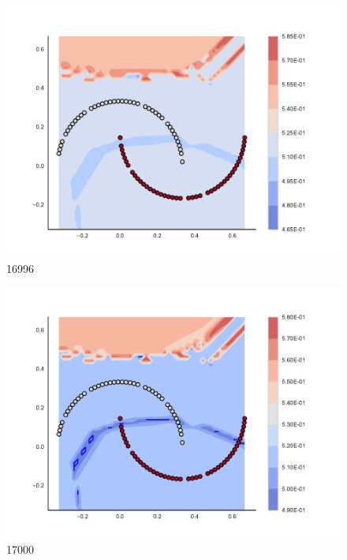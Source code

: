 \begin{subfigure}[b]{0.09\textwidth}
    \includegraphics[clip, trim=2.35cm 1.75cm 4.5cm 0cm,width=\textwidth]{img/convergence/16996.pdf}
    \caption{16996}
    \label{fig:convergence_16996}
\end{subfigure}
%
\begin{subfigure}[b]{0.09\textwidth}
    \includegraphics[clip, trim=2.35cm 1.75cm 4.5cm 0cm,width=\textwidth]{img/convergence/17000.pdf}
    \caption{17000}
    \label{fig:convergence_17000}
\end{subfigure}
%
